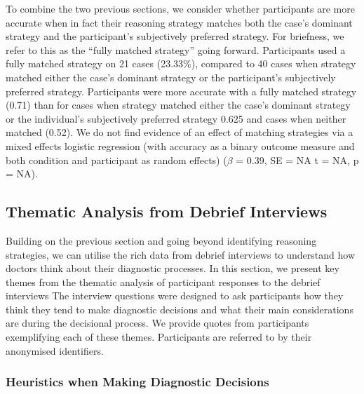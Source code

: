 \documentclass[a4paper, nobind]{templates/ociamthesis}
\begin{document}
\hfill\break

To combine the two previous sections, we consider whether participants are more accurate when in fact their reasoning strategy matches both the case's dominant strategy and the participant's subjectively preferred strategy. For briefness, we refer to this as the ``fully matched strategy'' going forward. Participants used a fully matched strategy on 21 cases (23.33\%), compared to 40 cases when strategy matched either the case's dominant strategy or the participant's subjectively preferred strategy. Participants were more accurate with a fully matched strategy (0.71) than for cases when strategy matched either the case's dominant strategy or the individual's subjectively preferred strategy 0.625 and cases when neither matched (0.52). We do not find evidence of an effect of matching strategies via a mixed effects logistic regression (with accuracy as a binary outcome measure and both condition and participant as random effects) (\(\beta\) = 0.39, SE = NA t = NA, p = NA).

\subsection*{Thematic Analysis from Debrief Interviews}\label{thematic-analysis-from-debrief-interviews}

Building on the previous section and going beyond identifying reasoning strategies, we can utilise the rich data from debrief interviews to understand how doctors think about their diagnostic processes. In this section, we present key themes from the thematic analysis of participant responses to the debrief interviews The interview questions were designed to ask participants how they think they tend to make diagnostic decisions and what their main considerations are during the decisional process. We provide quotes from participants exemplifying each of these themes. Participants are referred to by their anonymised identifiers.

\subsubsection*{Heuristics when Making Diagnostic Decisions}\label{heuristics-when-making-diagnostic-decisions}
\end{document}
